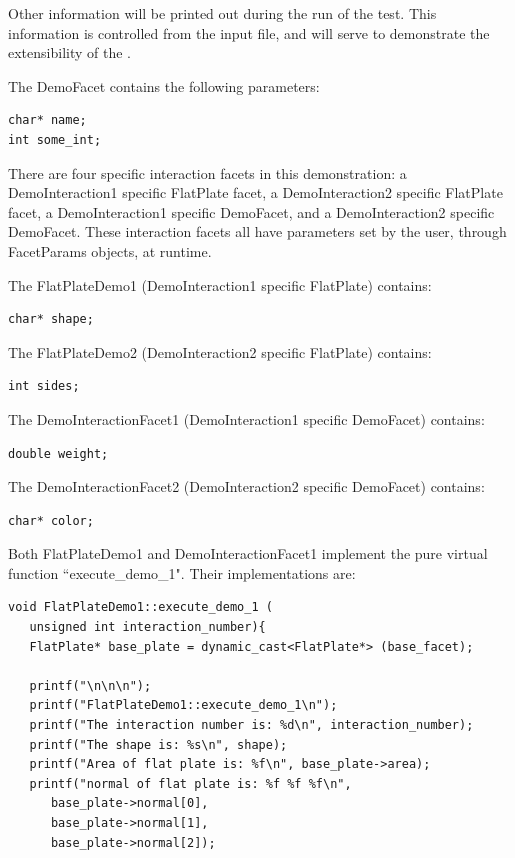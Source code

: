 \begin{description}
Other information will be printed out during the run of the test.
This information is controlled from the input file, and will serve
to demonstrate the extensibility of the \ModelDesc.

The DemoFacet contains the following parameters:

\begin{verbatim}
char* name;
int some_int;
\end{verbatim}

There are four specific interaction facets in this demonstration:
a DemoInteraction1 specific FlatPlate facet, a DemoInteraction2
specific FlatPlate facet, a DemoInteraction1 specific DemoFacet, and
a DemoInteraction2 specific DemoFacet. These interaction facets
all have parameters set by the user, through FacetParams objects, at
runtime.

The FlatPlateDemo1 (DemoInteraction1 specific FlatPlate) contains:

\begin{verbatim}
char* shape;
\end{verbatim}

The FlatPlateDemo2 (DemoInteraction2 specific FlatPlate) contains:

\begin{verbatim}
int sides;
\end{verbatim}

The DemoInteractionFacet1 (DemoInteraction1 specific DemoFacet) contains:

\begin{verbatim}
double weight;
\end{verbatim}

The DemoInteractionFacet2 (DemoInteraction2 specific DemoFacet) contains:

\begin{verbatim}
char* color;
\end{verbatim}

Both FlatPlateDemo1 and DemoInteractionFacet1 implement the pure
virtual function ``execute\_demo\_1". Their implementations are:

\begin{verbatim}
void FlatPlateDemo1::execute_demo_1 (
   unsigned int interaction_number){
   FlatPlate* base_plate = dynamic_cast<FlatPlate*> (base_facet);

   printf("\n\n\n");
   printf("FlatPlateDemo1::execute_demo_1\n");
   printf("The interaction number is: %d\n", interaction_number);
   printf("The shape is: %s\n", shape);
   printf("Area of flat plate is: %f\n", base_plate->area);
   printf("normal of flat plate is: %f %f %f\n",
      base_plate->normal[0],
      base_plate->normal[1],
      base_plate->normal[2]);


\end{verbatim}
\end{description}
